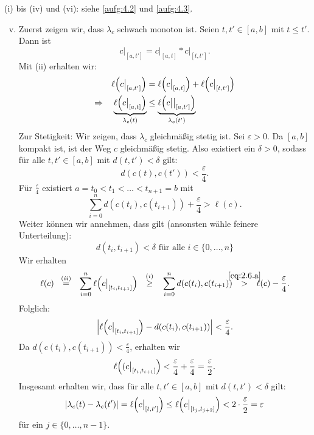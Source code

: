 \begin{beweis}
	(i) bis (iv) und (vi): siehe \autoref{aufg:4.2} und \autoref{aufg:4.3}.
	\begin{enumerate}[(i)]
		\setcounter{enumi}{4}
		\item Zuerst zeigen wir, dass $\lambda_c$ schwach monoton ist.
		Seien $t, t' \in [a,b]$ mit $t \leq t'$.
		Dann ist
		\[
			c \big|_{[a,t']} = c \big|_{[a,t]} * c\big|_{[t,t']}.
		\]
		Mit (ii) erhalten wir:
		\begin{align*}
			\ell\enbrace*{c \big|_{[a,t']}} &= \ell \enbrace*{c \big|_{[a,t]}} + \ell \enbrace*{c\big|_{[t,t']}} \\
			\Rightarrow \quad \Underbrace{\ell\enbrace*{c \big|_{[a,t]}}}{\lambda_c(t)} &\leq \Underbrace{\ell\enbrace*{c \big|\big|_{[a,t']}}}{\lambda_c(t')}
		\end{align*}
		Zur Stetigkeit:
		Wir zeigen, dass $\lambda_c$ gleichmäßig stetig ist.
		Sei $\varepsilon > 0$.
		Da $[a,b]$ kompakt ist, ist der Weg $c$ gleichmäßig stetig.
		Also existiert ein $\delta > 0$, sodass für alle $t, t' \in [a,b]$ mit $d(t,t') < \delta$ gilt:
		\[
			d(c(t),c(t')) < \frac{\varepsilon}{4}.
		\]
		Für $\frac{\varepsilon}{4}$ existiert $a = t_0 < t_1 < \dots < t_{n+1} = b$ mit
		\begin{equation}
			\sum\limits_{i=0}^{n} d(c(t_i),c(t_{i+1})) + \frac{\varepsilon}{4} > \ell(c). \label{eq:2.6.a}
		\end{equation}
		Weiter können wir annehmen, dass gilt (ansonsten wähle feinere Unterteilung):
		\begin{equation}
			d(t_i,t_{i+1}) < \delta \text{ für alle } i \in \{0,\dots,n\} \label{eq:2.6.b}
		\end{equation}
		Wir erhalten
		\begin{equation}
			\ell(c) \stack{(ii)}{=} \sum\limits_{i=0}^{n} \ell\enbrace*{ c\big|_{[t_i,t_{i+1}]}} \stack{(i)}{\geq} \sum\limits_{i=0}^n d(c(t_i),c(t_{i+1})) \stack{\eqref{eq:2.6.a}}{>} \ell(c) - \frac{\varepsilon}{4}.
		\end{equation}
		Folglich:
		\[
			\abs*{\ell\enbrace*{c\big|_{[t_i,t_{i+1}]}} - d(c(t_i),c(t_{i+1}))} < \frac{\varepsilon}{4}.
		\]
		Da $d(c(t_i),c(t_{i+1})) < \frac{\varepsilon}{4}$, erhalten wir
		\[
			\ell\enbrace*{(c \big|_{[t_i,t_{i+1}]}} < \frac{\varepsilon}{4} + \frac{\varepsilon}{4} = \frac{\varepsilon}{2}.
		\]
		Insgesamt erhalten wir, dass für alle $t,t' \in [a,b]$ mit $d(t,t') < \delta$ gilt:
		\[
			\abs{\lambda_c(t)-\lambda_c(t')} = \ell\enbrace*{c \big|_{[t,t']}} \leq \ell\enbrace*{c\big|_{[t_j,t_{j+2}]}} < 2 \cdot \frac{\varepsilon}{2} = \varepsilon
		\]
		für ein $j \in \{0, \dots, n-1\}$.
		

\end{enumerate}
\end{beweis}
